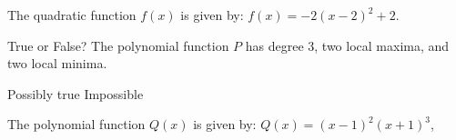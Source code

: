 \documentclass[11pt,answers]{exam}
\begin{document}
\begin{questions}


\addpoints

\question The quadratic function $f(x)$ is given by: $\displaystyle f(x) = -2(x-2)^2+2$. 


\question[1] True or False? The polynomial function $P$ has degree 3, two local maxima, and two local minima.
\begin{oneparchoices}
	\choice Possibly true \choice Impossible
\end{oneparchoices}

\question The polynomial function $Q(x)$ is given by: 
$\displaystyle Q(x) = (x-1)^2(x+1)^3$,

\end{questions}
\end{document}
